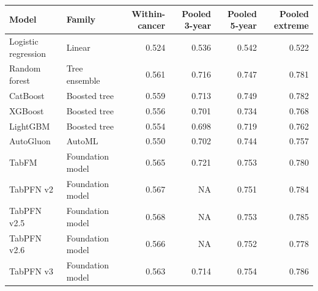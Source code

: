 \begin{tabular}{llrrrr}
\toprule
Model & Family & Within-cancer & Pooled 3-year & Pooled 5-year & Pooled extreme \\
\midrule
Logistic regression & Linear & 0.524 & 0.536 & 0.542 & 0.522 \\
Random forest & Tree ensemble & 0.561 & 0.716 & 0.747 & 0.781 \\
CatBoost & Boosted tree & 0.559 & 0.713 & 0.749 & 0.782 \\
XGBoost & Boosted tree & 0.556 & 0.701 & 0.734 & 0.768 \\
LightGBM & Boosted tree & 0.554 & 0.698 & 0.719 & 0.762 \\
AutoGluon & AutoML & 0.550 & 0.702 & 0.744 & 0.757 \\
TabFM & Foundation model & 0.565 & 0.721 & 0.753 & 0.780 \\
TabPFN v2 & Foundation model & 0.567 & NA & 0.751 & 0.784 \\
TabPFN v2.5 & Foundation model & 0.568 & NA & 0.753 & 0.785 \\
TabPFN v2.6 & Foundation model & 0.566 & NA & 0.752 & 0.778 \\
TabPFN v3 & Foundation model & 0.563 & 0.714 & 0.754 & 0.786 \\
\bottomrule
\end{tabular}
